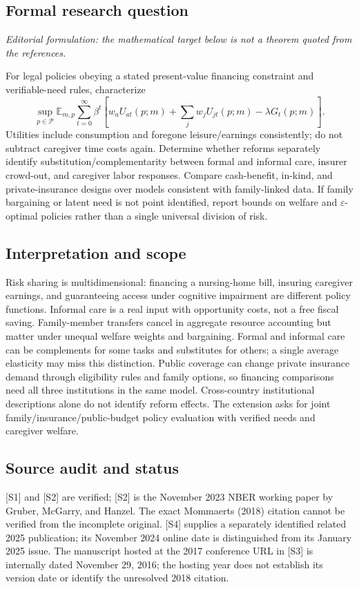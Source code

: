 \documentclass[11pt,a4paper]{article}
\begin{document}
\subsection*{Formal research question}
\emph{Editorial formulation: the mathematical target below is not a theorem quoted from the references.}

For legal policies obeying a stated present-value financing constraint and verifiable-need rules, characterize
\[
 \sup_{p\in\mathcal P}\mathbb E_{m,p}\sum_{t=0}^{\infty}\beta^t
 \left[w_a U_{at}(p;m)+\sum_jw_j U_{jt}(p;m)-\lambda G_t(p;m)\right].
\]
Utilities include consumption and foregone leisure/earnings consistently; do not subtract caregiver time costs again. Determine whether reforms separately identify substitution/complementarity between formal and informal care, insurer crowd-out, and caregiver labor responses. Compare cash-benefit, in-kind, and private-insurance designs over models consistent with family-linked data. If family bargaining or latent need is not point identified, report bounds on welfare and $\varepsilon$-optimal policies rather than a single universal division of risk.

\subsection*{Interpretation and scope}
Risk sharing is multidimensional: financing a nursing-home bill, insuring caregiver earnings, and guaranteeing access under cognitive impairment are different policy functions. Informal care is a real input with opportunity costs, not a free fiscal saving. Family-member transfers cancel in aggregate resource accounting but matter under unequal welfare weights and bargaining. Formal and informal care can be complements for some tasks and substitutes for others; a single average elasticity may miss this distinction. Public coverage can change private insurance demand through eligibility rules and family options, so financing comparisons need all three institutions in the same model. Cross-country institutional descriptions alone do not identify reform effects. The extension asks for joint family/insurance/public-budget policy evaluation with verified needs and caregiver welfare.

\subsection*{Source audit and status}
[S1] and [S2] are verified; [S2] is the November 2023 NBER working paper by Gruber, McGarry, and Hanzel. The exact Mommaerts (2018) citation cannot be verified from the incomplete original. [S4] supplies a separately identified related 2025 publication; its November 2024 online date is distinguished from its January 2025 issue. The manuscript hosted at the 2017 conference URL in [S3] is internally dated November 29, 2016; the hosting year does not establish its version date or identify the unresolved 2018 citation.
\end{document}
